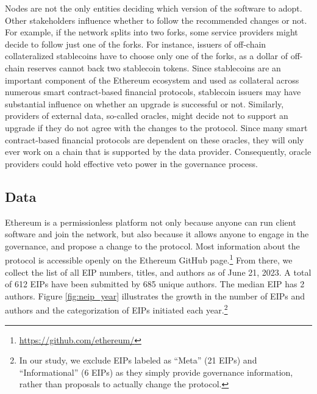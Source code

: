 \documentclass[No]{AEA}
\begin{document}
Nodes are not the only entities deciding which version of the software to adopt. Other stakeholders influence whether to follow the recommended changes or not. For example, if the network splits into two forks, some service providers might decide to follow just one of the forks. For instance, issuers of off-chain collateralized stablecoins have to choose only one of the forks, as a dollar of off-chain reserves cannot back two stablecoin tokens. Since stablecoins are an important component of the Ethereum ecosystem and used as collateral across numerous smart contract-based financial protocols, stablecoin issuers may have substantial influence on whether an upgrade is successful or not. Similarly, providers of external data, so-called oracles, might decide not to support an upgrade if they do not agree with the changes to the protocol. Since many smart contract-based financial protocols are dependent on these oracles, they will only ever work on a chain that is supported by the data provider. Consequently, oracle providers could hold effective veto power in the governance process. 

\subsection{Data} \label{subsec_data}

Ethereum is a permissionless platform not only because anyone can run client software and join the network, but also because it allows anyone to engage in the governance, and propose a change to the protocol. Most information about the protocol is accessible openly on the Ethereum GitHub page.\footnote{\url{https://github.com/ethereum/}} From there, we collect the list of all EIP numbers, titles, and authors as of June 21, 2023. A total of 612 EIPs have been submitted by 685 unique authors. The median EIP has 2 authors. Figure \ref{fig:neip_year} illustrates the growth in the number of EIPs and authors and the categorization of EIPs initiated each year.\footnote{In our study, we exclude EIPs labeled as ``Meta'' (21 EIPs) and ``Informational'' (6 EIPs) as they simply provide governance information, rather than proposals to actually change the protocol.} 
\end{document}
